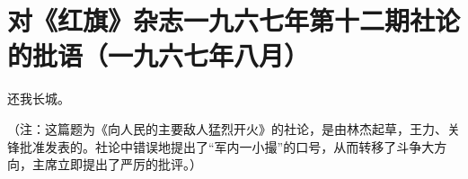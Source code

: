\section[对《红旗》杂志一九六七年第十二期社论的批语（一九六七年八月）]{对《红旗》杂志一九六七年第十二期社论的批语（一九六七年八月）}


还我长城。

（注：这篇题为《向人民的主要敌人猛烈开火》的社论，是由林杰起草，王力、关锋批准发表的。社论中错误地提出了“军内一小撮”的口号，从而转移了斗争大方向，主席立即提出了严厉的批评。）

